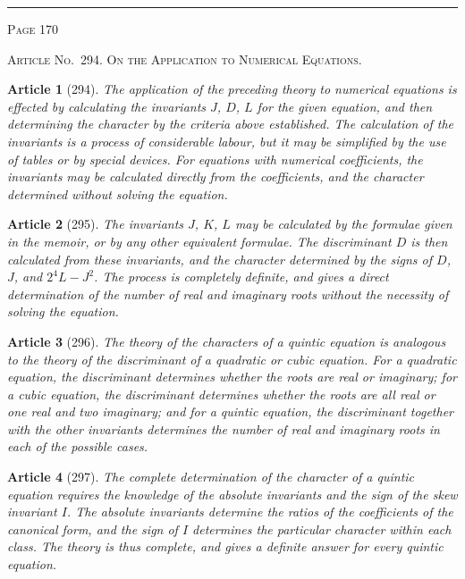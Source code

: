 \documentclass[11pt,a4paper]{article}
\theoremstyle{cayley}
\newtheorem{art}{Article}
\begin{document}
\vspace{1em}
\noindent\rule{\textwidth}{0.4pt}
\begin{center}\textsc{Page 170}\end{center}
\newpage

\begin{center}
\textsc{Article No.\ 294. On the Application to Numerical Equations.}
\end{center}

\begin{art}[294]
The application of the preceding theory to numerical equations is effected by calculating the invariants $J$, $D$, $L$ for the given equation, and then determining the character by the criteria above established. The calculation of the invariants is a process of considerable labour, but it may be simplified by the use of tables or by special devices. For equations with numerical coefficients, the invariants may be calculated directly from the coefficients, and the character determined without solving the equation.
\end{art}

\begin{art}[295]
The invariants $J$, $K$, $L$ may be calculated by the formulae given in the memoir, or by any other equivalent formulae. The discriminant $D$ is then calculated from these invariants, and the character determined by the signs of $D$, $J$, and $2^4L-J^2$. The process is completely definite, and gives a direct determination of the number of real and imaginary roots without the necessity of solving the equation.
\end{art}

\begin{art}[296]
The theory of the characters of a quintic equation is analogous to the theory of the discriminant of a quadratic or cubic equation. For a quadratic equation, the discriminant determines whether the roots are real or imaginary; for a cubic equation, the discriminant determines whether the roots are all real or one real and two imaginary; and for a quintic equation, the discriminant together with the other invariants determines the number of real and imaginary roots in each of the possible cases.
\end{art}

\begin{art}[297]
The complete determination of the character of a quintic equation requires the knowledge of the absolute invariants and the sign of the skew invariant $I$. The absolute invariants determine the ratios of the coefficients of the canonical form, and the sign of $I$ determines the particular character within each class. The theory is thus complete, and gives a definite answer for every quintic equation.
\end{art}
\end{document}
